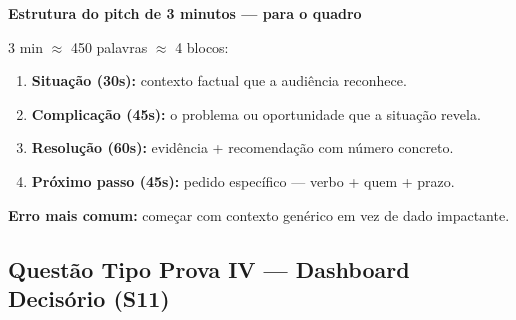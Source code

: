 \begin{BoardBox}
\textbf{Estrutura do pitch de 3 minutos — para o quadro}

3 min $\approx$ 450 palavras $\approx$ 4 blocos:

\begin{enumerate}
  \item \textbf{Situação (30s):} contexto factual que a audiência reconhece.
  \item \textbf{Complicação (45s):} o problema ou oportunidade que a situação revela.
  \item \textbf{Resolução (60s):} evidência + recomendação com número concreto.
  \item \textbf{Próximo passo (45s):} pedido específico — verbo + quem + prazo.
\end{enumerate}

\textbf{Erro mais comum:} começar com contexto genérico em vez de dado impactante.
\end{BoardBox}

\subsection{Questão Tipo Prova IV — Dashboard Decisório (S11)}


